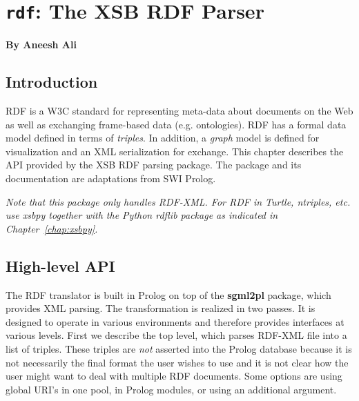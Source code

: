 
\chapter{{\tt rdf}: The XSB RDF Parser}

\begin{center}
  {\Large {\bf By Aneesh Ali}}
\end{center}

\section{Introduction}

RDF is a W3C standard for representing meta-data about documents
on the Web as well as exchanging frame-based data (e.g. ontologies). RDF
has a formal
data model defined in terms of {\it triples}. In addition, a
{\it graph} model is defined for visualization and an XML serialization
for exchange.
This chapter describes the API provided by the XSB RDF parsing package.
The package and its documentation are adaptations
from SWI Prolog.

{\em Note that this package only handles RDF-XML.  For RDF in Turtle,
  ntriples, etc. use xsbpy together with the Python rdflib package as
  indicated in Chapter~\ref{chap:xsbpy}.}
  
\section{High-level API}

The RDF translator is built in Prolog on top of the {\bf sgml2pl}
package, which provides XML parsing.
The transformation is realized in two passes.
It is designed to operate in various environments and therefore
provides interfaces at various levels. First we describe the top level,
which parses RDF-XML file into a list of
triples. These triples are {\em not} asserted into the Prolog database
because it is not necessarily the final format the user wishes to use
and it is not clear how the user might want to deal with multiple RDF
documents.  Some options are using global URI's in one pool, in Prolog
modules, or using an additional argument.

